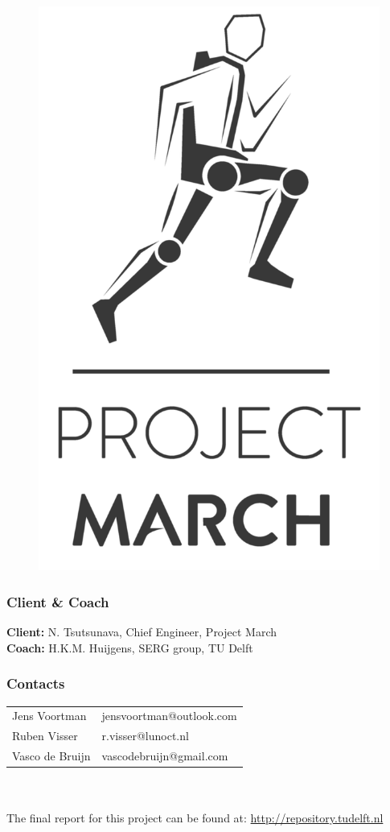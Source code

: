 \begin{small}
\begin{figure}
	\raggedleft
	\includegraphics[scale=0.0315]{logo/Project_MARCH2}
\end{figure}

\subsubsection{Client \& Coach}
{\bfseries Client:} N. Tsutsunava, Chief Engineer, Project March\\
{\bfseries Coach:} H.K.M. Huijgens, SERG group, TU Delft

\subsubsection{Contacts}
\begin{tabular}{l l}
	Jens Voortman & jensvoortman@outlook.com\\
	Ruben Visser & r.visser@lunoct.nl\\
	Vasco de Bruijn & vascodebruijn@gmail.com\\
\end{tabular}\\\\
The final report for this project can be found at: \url{http://repository.tudelft.nl}
\end{small}